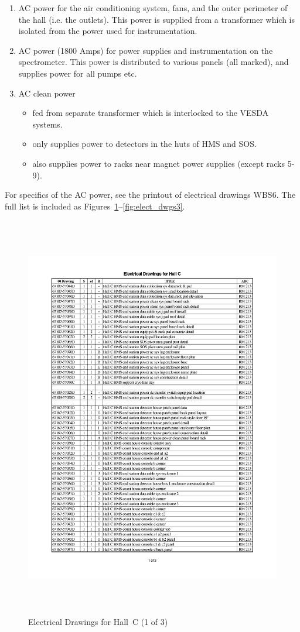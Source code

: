 {\begin{enumerate}
\item{AC power for the air conditioning system, fans, and the
outer perimeter of the hall (i.e. the outlets). This power is
supplied from a transformer which is isolated from the power
used for instrumentation.}
\item{AC power (1800 Amps) for power supplies and instrumentation
on the spectrometer. This power is distributed to various panels
(all marked), and supplies power for all pumps etc.}
\item{AC clean power
\begin{itemize}
\item{fed from separate transformer which is interlocked to the
VESDA systems.}
\item{only supplies power to detectors in the huts of HMS and SOS.}
\item{also supplies power to racks near magnet power supplies (except
racks 5-9).}
\end{itemize}}
\end{enumerate}

For specifics of the AC power, see the printout of electrical drawings
WBS6. The full list is included as  Figures~\ref{fig:elect_dwgs1}--\ref{fig:elect_dwgs3}.
\clearpage
\begin{figure}
\begin{center}
\includegraphics[height=7in]{ele1p.pdf}
\caption{Electrical Drawings for Hall~C (1 of 3)}
\label{fig:elect_dwgs1}
\end{center}
\end{figure}

}
